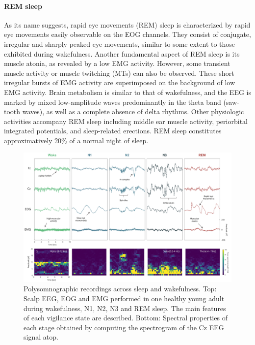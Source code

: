 \paragraph{REM sleep}
As its name suggests, rapid eye movements (REM) sleep is characterized by rapid eye movements easily observable on the EOG channels. They consist of conjugate, irregular and sharply peaked eye movements, similar to some extent to those exhibited during wakefulness. Another fundamental aspect of REM sleep is its muscle atonia, as revealed by a low EMG activity. However, some transient muscle activity or muscle twitching (MTs) can also be observed. These short irregular bursts of EMG activity are superimposed on the background of low EMG activity. Brain metabolism is similar to that of wakefulness, and the EEG is marked by mixed low-amplitude waves predominantly in the theta band (saw-tooth waves), as well as a complete absence of delta rhythms. Other physiologic activities accompany REM sleep including middle ear muscle activity, periorbital integrated potentials, and sleep-related erections. REM sleep constitutes approximatively 20\% of a normal night of sleep.

\begin{figure}[htb]
	\includegraphics[width=\textwidth]{Fig/Intro/Intro_Sleep_Stages_PSD/Fig_Intro_Sleep_Stages_PSD_final_150517.png}
	\caption[Polysomnographic recordings across sleep and wakefulness]{Polysomnographic recordings across sleep and wakefulness. Top: Scalp EEG, EOG and EMG performed in one healthy young adult during wakefulness, N1, N2, N3 and REM sleep. The main features of each vigilance state are described. Bottom: Spectral properties of each stage obtained by computing the spectrogram of the Cz EEG signal atop.}
	\label{fig:intro:sleep_stage}
\end{figure}


